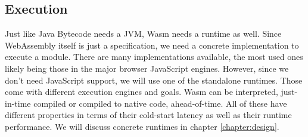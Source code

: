 
\subsection{Execution}

Just like Java Bytecode needs a JVM, Wasm needs a runtime as well. Since WebAssembly itself is just a specification, we need a concrete implementation to execute a module. There are many implementations available, the most used ones likely being those in the major browser JavaScript engines. However, since we don't need JavaScript support, we will use one of the standalone runtimes. Those come with different execution engines and goals. Wasm can be interpreted, just-in-time compiled or compiled to native code, ahead-of-time. All of these have different properties in terms of their cold-start latency as well as their runtime performance. We will discuss concrete runtimes in chapter \ref{chapter:design}.
